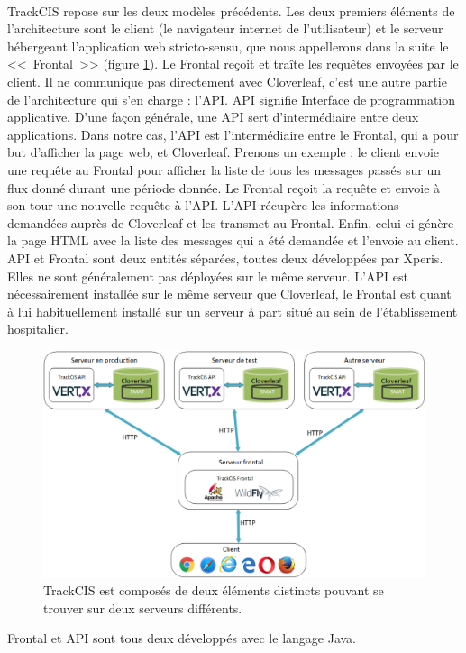 			\paragraph{}%
			TrackCIS repose sur les deux modèles précédents. Les deux
			premiers éléments de l'architecture sont le client (le navigateur internet
			de l'utilisateur) et le serveur hébergeant l'application web stricto-sensu,
			que nous appellerons dans la suite le <<~Frontal~>> (figure
			\ref{archi_trackcis}).
			Le Frontal reçoit et traîte les requêtes envoyées par le client. Il
			ne communique pas directement avec Cloverleaf, c'est une autre partie de
			l'architecture qui s'en charge : l'API.
			API signifie Interface de programmation applicative. D'une façon générale,
			une API sert d'intermédiaire entre deux applications. Dans notre cas, l'API est
			l'intermédiaire entre le Frontal, qui a pour but d'afficher la page web, et
			Cloverleaf. Prenons un exemple : le client envoie une requête au Frontal
			pour afficher la liste de tous les messages passés sur un flux donné durant
			une période donnée. Le Frontal reçoit la requête et envoie à son tour une
			nouvelle requête à l'API.
			L'API récupère les informations demandées auprès de Cloverleaf et
			les transmet au Frontal. Enfin, celui-ci génère la page HTML avec la liste
			des messages qui a été demandée et l'envoie au client.\newline
			API et Frontal sont deux entités séparées, toutes deux développées par
			Xperis. Elles ne sont généralement pas déployées sur le même serveur. L'API
			est nécessairement installée sur le même serveur que Cloverleaf, le Frontal est
			quant à lui habituellement installé sur un serveur à part situé au
			sein de l'établissement hospitalier.
			\begin{figure}[H]%
				\centering
				\includegraphics[width=14cm]{../img/part3/archi_trackcis.png}
				\caption{\label{archi_trackcis} TrackCIS est composés de deux éléments
				distincts pouvant se trouver sur deux serveurs différents.}
			\end{figure}
			Frontal et API sont tous deux développés avec le langage Java.
			
